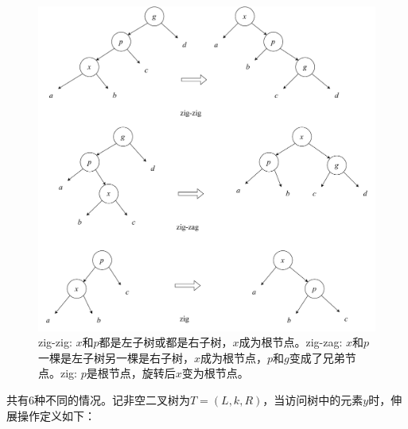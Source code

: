 \documentclass[b5paper]{ctexart}
\begin{document}
\begin{figure}[htbp]
  \centering
  \includegraphics[scale=0.45]{img/splay}
  \caption{zig-zig: $x$和$p$都是左子树或都是右子树，$x$成为根节点。zig-zag: $x$和$p$一棵是左子树另一棵是右子树，$x$成为根节点，$p$和$g$变成了兄弟节点。zig: $p$是根节点，旋转后$x$变为根节点。}
  \label{fig:splay}
\end{figure}

共有6种不同的情况。记非空二叉树为$T=(L, k, R)$，当访问树中的元素$y$时，伸展操作定义如下：
\end{document}
